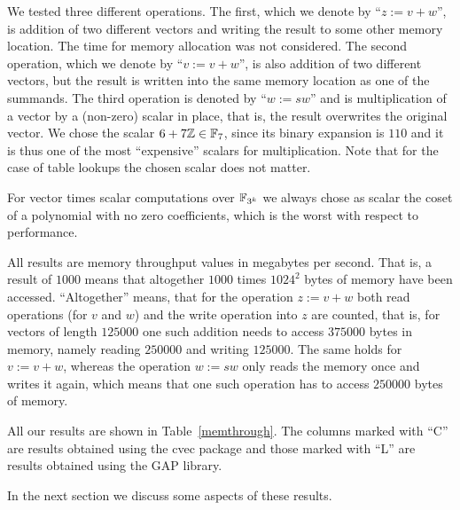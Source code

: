 We tested three different operations. The first, which we denote by 
``$z := v+w$'', is addition of two different vectors and writing the
result to some other memory location. The time for memory allocation
was not considered. The second operation, which we denote by 
``$v := v+w$'', is also addition of two different vectors, but the result
is written into the same memory location as one of the summands.
The third operation is denoted by ``$w := sw$'' and is multiplication
of a vector by a (non-zero) scalar in place, that is, the result overwrites
the original vector. We chose the scalar $6 + 7\mathbb{Z} \in \mathbb{F}_7$, since its
binary expansion is $110$ and it is thus one of the most ``expensive'' scalars
for multiplication. Note that for the case of table lookups the chosen
scalar does not matter.

For vector times scalar computations over $\mathbb{F}_{3^k}$ we always chose as
scalar the coset of a polynomial with no zero coefficients, which is
the worst with respect to performance.

All results are memory throughput values in megabytes per second. 
That is, a result of $1000$ means that altogether $1000$ times
$1024^2$ bytes of memory have been accessed. ``Altogether'' means, that for
the operation $z := v+w$ both read operations (for $v$ and $w$) and the
write operation into $z$ are counted, that is, for vectors of length
$125000$ one such addition needs to access $375000$ bytes in memory,
namely reading $250000$ and writing $125000$. The same holds for
$v := v + w$, whereas the operation $w := sw$ only reads the memory once
and writes it again, which means that one such operation has to access
$250000$ bytes of memory.

All our results are shown in Table~\ref{memthrough}. The columns marked
with ``C'' are results obtained using the {\sf cvec} package and those 
marked with ``L'' are results obtained using the {\sf GAP} library.

In the next section we discuss some aspects of these results.

